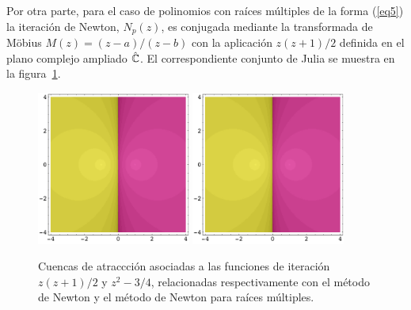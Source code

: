 Por otra parte, para el caso de polinomios con raíces múltiples de la forma (\ref{eq5}) la iteración de Newton, $N_p(z)$, es conjugada mediante la transformada de M\"obius $M(z)=(z-a)/(z-b)$ con la aplicación $z(z+1)/2$ definida en el plano complejo ampliado $\hat {\mathbb{C}}$. El correspondiente conjunto de Julia  se muestra en la figura~\ref{figura1230}.
\begin{figure}[htbp]
    \centering
\includegraphics[width=0.45\textwidth]{NDfigura0.pdf}
\includegraphics[width=0.45\textwidth]{NDfigura0.pdf}
    \caption{Cuencas de atraccción asociadas a las funciones de iteración  $z(z+1)/2$ y $z^2-3/4$, relacionadas respectivamente con el método de Newton y el método de Newton para raíces múltiples.}
    \label{figura1230}
 \end{figure}
 
